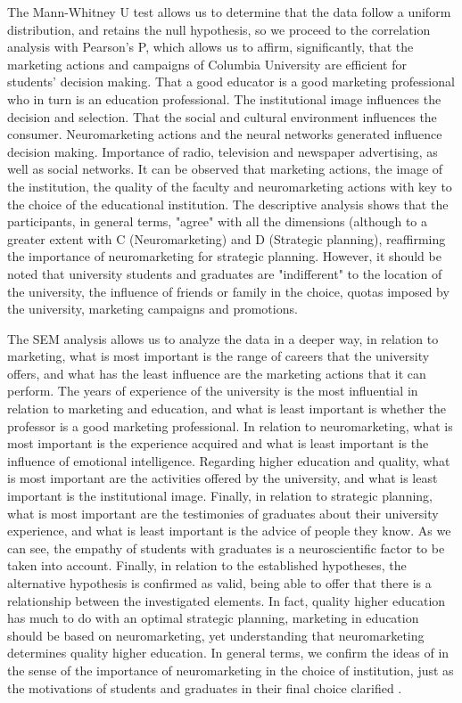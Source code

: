\documentclass[english]{textolivre}
\begin{document}
The Mann-Whitney U test allows us to determine that the data follow a uniform distribution, and retains the null hypothesis, so we proceed to the correlation analysis with Pearson's P, which allows us to affirm, significantly, that the marketing actions and campaigns of Columbia University are efficient for students' decision making. That a good educator is a good marketing professional who in turn is an education professional. The institutional image influences the decision and selection. That the social and cultural environment influences the consumer. Neuromarketing actions and the neural networks generated influence decision making. Importance of radio, television and newspaper advertising, as well as social networks. It can be observed that marketing actions, the image of the institution, the quality of the faculty and neuromarketing actions with key to the choice of the educational institution. The descriptive analysis shows that the participants, in general terms, "agree" with all the dimensions (although to a greater extent with C (Neuromarketing) and D (Strategic planning), reaffirming the importance of neuromarketing for strategic planning. However, it should be noted that university students and graduates are "indifferent" to the location of the university, the influence of friends or family in the choice, quotas imposed by the university, marketing campaigns and promotions.

The SEM analysis allows us to analyze the data in a deeper way, in relation to marketing, what is most important is the range of careers that the university offers, and what has the least influence are the marketing actions that it can perform. The years of experience of the university is the most influential in relation to marketing and education, and what is least important is whether the professor is a good marketing professional. In relation to neuromarketing, what is most important is the experience acquired and what is least important is the influence of emotional intelligence. Regarding higher education and quality, what is most important are the activities offered by the university, and what is least important is the institutional image. Finally, in relation to strategic planning, what is most important are the testimonies of graduates about their university experience, and what is least important is the advice of people they know. As we can see, the empathy of students with graduates is a neuroscientific factor to be taken into account. Finally, in relation to the established hypotheses, the alternative hypothesis is confirmed as valid, being able to offer that there is a relationship between the investigated elements. In fact, quality higher education has much to do with an optimal strategic planning, marketing in education should be based on neuromarketing, yet understanding that neuromarketing determines quality higher education. In general terms, we confirm the ideas of \textcite{barco_neuromarketing_2021,caicedo_bibliometric_2021} in the sense of the importance of neuromarketing in the choice of institution, just as the motivations of students and graduates in their final choice clarified \cite{lambin_strategic_1992,kotler_marketing_2009,llorente_alonso_marketing_2017}.
\end{document}

